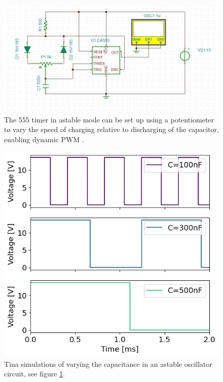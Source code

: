 \documentclass[%
 reprint,
 amsmath,amssymb,
 aps,
]{revtex4-2}
\begin{document}
        \begin{figure}
        \includegraphics[width=1.6\columnwidth]{Images/potentiometer}
        \caption{\label{fig:potentiometer}The 555 timer in astable mode can be set up using a potentiometer to vary the speed of charging relative to discharging of the capacitor, enabling dynamic PWM \cite{ucd}.}
        \end{figure}

        \begin{figure}
        \includegraphics[width=0.9\columnwidth]{Images/potentiometerFrequency.png}
        \caption{\label{fig:potentiometerFrequency}Tina simulations of varying the capacitance in an astable oscillator circuit, see figure \ref{fig:potentiometer}.}
        \end{figure}
\end{document}
